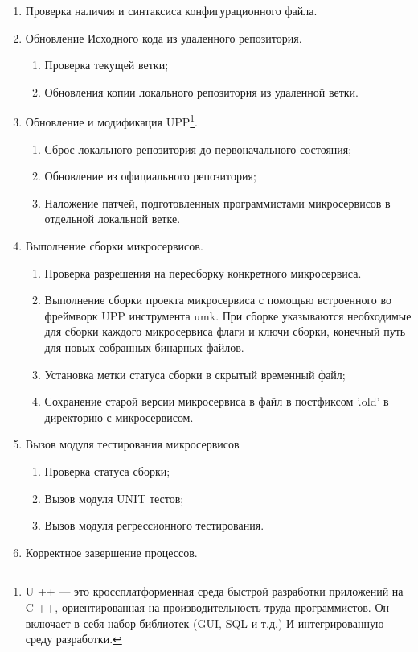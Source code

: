 \begin{enumerate}
	\item Проверка наличия и синтаксиса конфигурационного файла.
	\item Обновление Исходного кода из удаленного репозитория.
	\begin{enumerate}
		\item Проверка текущей ветки;
		\item Обновления копии локального репозитория из удаленной ветки.
	\end{enumerate}
	\item Обновление и модификация UPP\footnote{U ++ --- это кроссплатформенная среда быстрой разработки приложений на C ++, ориентированная на производительность труда программистов. Он включает в себя набор библиотек (GUI, SQL и т.д.) И интегрированную среду разработки.}.
	\begin{enumerate}
		\item Сброс локального репозитория до первоначального состояния;
		\item Обновление из официального репозитория;
		\item Наложение патчей, подготовленных программистами микросервисов в отдельной локальной ветке.
	\end{enumerate}
	\item Выполнение сборки микросервисов.
	\begin{enumerate}
		\item Проверка разрешения на пересборку конкретного микросервиса.
		\item Выполнение сборки проекта микросервиса с помощью встроенного во фреймворк UPP инструмента umk. При сборке указываются необходимые для сборки каждого микросервиса флаги и ключи сборки, конечный путь для новых собранных бинарных файлов.
		\item Установка метки статуса сборки в скрытый временный файл;
		\item Сохранение старой версии микросервиса в файл в постфиксом '.old' в директорию с микросервисом.
	\end{enumerate}
	\item Вызов модуля тестирования микросервисов
	\begin{enumerate}
		\item Проверка статуса сборки;
		\item Вызов модуля UNIT тестов;
		\item Вызов модуля регрессионного тестирования.
	\end{enumerate}
	\item Корректное завершение процессов.

\end{enumerate}
